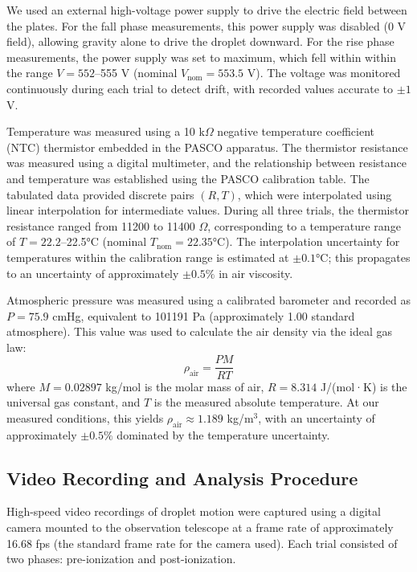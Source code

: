 \documentclass[11pt]{article}
\begin{document}
We used an external high-voltage power supply to drive the electric field between the plates. For the fall phase measurements, this power supply was disabled (0 V field), allowing gravity alone to drive the droplet downward. For the rise phase measurements, the power supply was set to maximum, which fell within within the range $V = 552$--555 V (nominal $V_{\text{nom}} = 553.5$ V). The voltage was monitored continuously during each trial to detect drift, with recorded values accurate to $\pm 1$ V.

Temperature was measured using a 10 k$\Omega$ negative temperature coefficient (NTC) thermistor embedded in the PASCO apparatus. The thermistor resistance was measured using a digital multimeter, and the relationship between resistance and temperature was established using the PASCO calibration table. The tabulated data provided discrete pairs $(R, T)$, which were interpolated using linear interpolation for intermediate values. During all three trials, the thermistor resistance ranged from 11200 to 11400 $\Omega$, corresponding to a temperature range of $T = 22.2$--22.5°C (nominal $T_{\text{nom}} = 22.35$°C). The interpolation uncertainty for temperatures within the calibration range is estimated at $\pm 0.1$°C; this propagates to an uncertainty of approximately $\pm 0.5\%$ in air viscosity.

Atmospheric pressure was measured using a calibrated barometer and recorded as $P = 75.9$ cmHg, equivalent to 101191 Pa (approximately 1.00 standard atmosphere). This value was used to calculate the air density via the ideal gas law:
\begin{equation}
\rho_{\text{air}} = \frac{PM}{RT}
\end{equation}
where $M = 0.02897$ kg/mol is the molar mass of air, $R = 8.314$ J/(mol·K) is the universal gas constant, and $T$ is the measured absolute temperature. At our measured conditions, this yields $\rho_{\text{air}} \approx 1.189$ kg/m$^3$, with an uncertainty of approximately $\pm 0.5\%$ dominated by the temperature uncertainty.

\subsection{Video Recording and Analysis Procedure}

High-speed video recordings of droplet motion were captured using a digital camera mounted to the observation telescope at a frame rate of approximately 16.68 fps (the standard frame rate for the camera used). Each trial consisted of two phases: pre-ionization and post-ionization.
\end{document}
